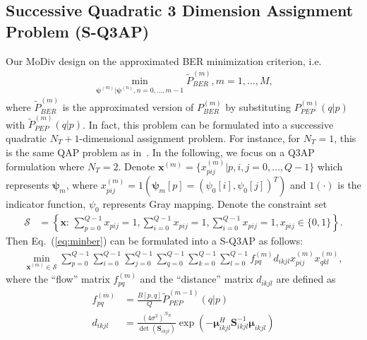 \documentclass[journal,draftcls,onecolumn,12pt,twoside]{IEEEtran}
\begin{document}
\subsection{Successive Quadratic 3 Dimension Assignment Problem (S-Q3AP)}
\label{ssec:q3ap}
Our MoDiv design on the approximated BER minimization criterion,
i.e.
\begin{align}
    \min_{\bm{\psi}^{(m)}|\bm{\psi}^{(n)},
    n=0,\ldots,m-1}\tilde{P}_{BER}^{(m)},m=1,\ldots,M,\label{eq:minber}
\end{align}
where $\tilde{P}_{BER}^{(m)}$ is the approximated version of
$P_{BER}^{(m)}$ by substituting $P_{PEP}^{(m)}(q|p)$ with
$\tilde{P}_{PEP}^{(m)}(q|p)$. In fact, this problem can be formulated into a
successive quadratic $N_T + 1$-dimensional assignment problem. For instance, for
$N_T=1$, this is the same QAP problem as in~\cite{samra2005symbol}. In the following, we
focus on a Q3AP formulation where $N_T = 2$. Denote $\mathbf{x}^{(m)} =
\{x_{pij}^{(m)}|p,i,j=0,\ldots,Q-1\}$ which represents $\bm{\psi}_m$, where
$x_{pij}^{(m)} = 1(\bm{\psi}_m[p] =
(\psi_0[i], \psi_0[j])^T)$ and $1(\cdot)$ is the indicator function, $\psi_0$
represents Gray mapping. Denote the constraint set
\begin{subequations}
  \begin{align}
    \mathcal{S} & = \left\{\mathbf{x}:\,\sum_{p=0}^{Q-1}x_{pij} = 1,
    \sum_{i=0}^{Q-1}x_{pij} = 1, \sum_{i=0}^{Q-1}x_{pij} = 1, x_{pij}\in\{0,
    1\}\right\}.
    \label{eq:constraint}
  \end{align}
\end{subequations}
Then Eq.~(\ref{eq:minber}) can be formulated into a S-Q3AP as follows:
\begin{align}
  \min_{\mathbf{x}^{(m)}\in \mathcal{S}}
  \sum_{p=0}^{Q-1}\sum_{i=0}^{Q-1}\sum_{j=0}^{Q-1}
  \sum_{q=0}^{Q-1}\sum_{k=0}^{Q-1}\sum_{l=0}^{Q-1}
  f_{pq}^{(m)}d_{ikjl}x_{pij}^{(m)}x_{qkl}^{(m)},
  \label{eq:SQ3AP}
\end{align}
where the ``flow'' matrix $f_{pq}^{(m)}$ and the ``distance'' matrix $d_{ikjl}$
are defined as
\begin{subequations}
  \begin{align}
    f_{pq}^{(m)} & = \frac{B[p,q]}{Q}\tilde{P}_{PEP}^{(m-1)}(q|p) \\
    d_{ikjl} & = \frac{(4\sigma^2)^{N_R}}{\det(\mathbf{S}_{ikjl})}
        \exp\left(-\bm{\mu}_{ikjl}^H\mathbf{S}_{ikjl}^{-1}\bm{\mu}_{ikjl}\right)
  \end{align}
\end{subequations}
\end{document}
